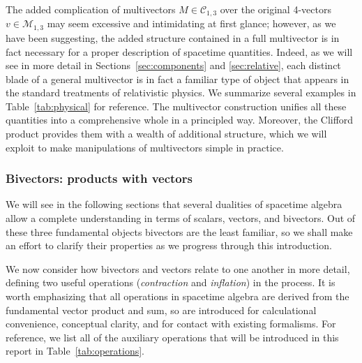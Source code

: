 \documentclass[1p,sort&compress]{elsarticle}
\numberwithin{equation}{section}
\begin{document}
The added complication of multivectors $M\in\mathcal{C}_{1,3}$ over the original 4-vectors $v\in\mathcal{M}_{1,3}$ may seem excessive and intimidating at first glance; however, as we have been suggesting, the added structure contained in a full multivector is in fact necessary for a proper description of spacetime quantities.  Indeed, as we will see in more detail in Sections~\ref{sec:components} and \ref{sec:relative}, each distinct blade of a general multivector is in fact a familiar type of object that appears in the standard treatments of relativistic physics.  We summarize several examples in Table~\ref{tab:physical} for reference.  The multivector construction unifies all these quantities into a comprehensive whole in a principled way.  Moreover, the Clifford product provides them with a wealth of additional structure, which we will exploit to make manipulations of multivectors simple in practice.


\subsubsection{Bivectors: products with vectors}\label{sec:bivectorvector}


We will see in the following sections that several dualities of spacetime algebra allow a complete understanding in terms of scalars, vectors, and bivectors.  Out of these three fundamental objects bivectors are the least familiar, so we shall make an effort to clarify their properties as we progress through this introduction.  

We now consider how bivectors and vectors relate to one another in more detail, defining two useful operations (\emph{contraction} and \emph{inflation}) in the process.  It is worth emphasizing that all operations in spacetime algebra are derived from the fundamental vector product and sum, so are introduced for calculational convenience, conceptual clarity, and for contact with existing formalisms.  For reference, we list all of the auxiliary operations that will be introduced in this report in Table~\ref{tab:operations}.
\end{document}
